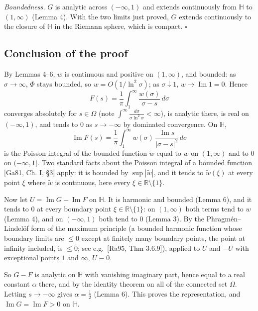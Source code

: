 \documentclass[
  11pt,
]{article}
\begin{document}
\emph{Boundedness.} \(G\) is analytic across \((-\infty,1)\) and extends
continuously from \(\mathbb{H}\) to \((1,\infty)\) (Lemma 4). With the
two limits just proved, \(G\) extends continuously to the closure of
\(\mathbb{H}\) in the Riemann sphere, which is compact. \(\square\)

\hypertarget{conclusion-of-the-proof}{%
\subsection{Conclusion of the proof}\label{conclusion-of-the-proof}}

By Lemmas 4--6, \(w\) is continuous and positive on \((1,\infty)\), and
bounded: as \(\sigma\to\infty\), \(\Phi\) stays bounded, so
\(w = O(1/\ln^2\sigma)\); as \(\sigma \downarrow 1\),
\(w \to \operatorname{Im} 1 = 0\). Hence \[
F(s) = \frac1\pi\int_1^\infty \frac{w(\sigma)}{\sigma - s}\, d\sigma
\] converges absolutely for \(s \in \Omega\) (note
\(\int^\infty \frac{d\sigma}{\sigma\ln^2\sigma} < \infty\)), is analytic
there, is real on \((-\infty,1)\), and tends to \(0\) as
\(s \to -\infty\) by dominated convergence. On \(\mathbb{H}\), \[
\operatorname{Im} F(s) = \frac1\pi\int_1^\infty w(\sigma)\, \frac{\operatorname{Im} s}{|\sigma - s|^2}\, d\sigma
\] is the Poisson integral of the bounded function \(\tilde w\) equal to
\(w\) on \((1,\infty)\) and to \(0\) on \((-\infty,1]\). Two standard
facts about the Poisson integral of a bounded function {[}Ga81, Ch. I,
§3{]} apply: it is bounded by \(\sup|\tilde w|\), and it tends to
\(\tilde w(\xi)\) at every point \(\xi\) where \(\tilde w\) is
continuous, here every \(\xi \in \mathbb{R}\setminus\{1\}\).

Now let \(U = \operatorname{Im} G - \operatorname{Im} F\) on
\(\mathbb{H}\). It is harmonic and bounded (Lemma 6), and it tends to
\(0\) at every boundary point \(\xi \in \mathbb{R}\setminus\{1\}\): on
\((1,\infty)\) both terms tend to \(w\) (Lemma 4), and on
\((-\infty,1)\) both tend to \(0\) (Lemma 3). By the Phragmén--Lindelöf
form of the maximum principle (a bounded harmonic function whose
boundary limits are \(\le 0\) except at finitely many boundary points,
the point at infinity included, is \(\le 0\); see e.g.~{[}Ra95, Thm
3.6.9{]}), applied to \(U\) and \(-U\) with exceptional points \(1\) and
\(\infty\), \(U \equiv 0\).

So \(G - F\) is analytic on \(\mathbb{H}\) with vanishing imaginary
part, hence equal to a real constant \(\alpha\) there, and by the
identity theorem on all of the connected set \(\Omega\). Letting
\(s \to -\infty\) gives \(\alpha = \tfrac12\) (Lemma 6). This proves the
representation, and \(\operatorname{Im} G = \operatorname{Im} F > 0\) on
\(\mathbb{H}\).
\end{document}
